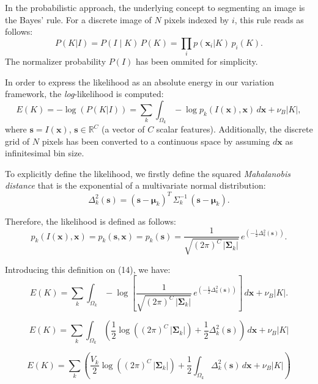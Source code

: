 In the probabilistic approach, the underlying concept to segmenting an image is the
Bayes' rule. For a discrete image of $N$ pixels indexed by $i$, this rule reads as
follows:
\begin{equation}
P(K|I)=P(I \mid K)\, P(K)=\underset{i}{\prod} p (\mathbf{x}_i | K ) \, p_i(K).
\end{equation}
The normalizer probability $P(I)$ has been ommited for simplicity.

In order to express the likelihood as an absolute energy in our variation framework,
the \textit{log}-likelihood is computed:
\begin{equation}
E(K)= -\log( P(K|I) ) = \sum\limits_k \int_{\Omega_k} -\log p_k(I(\mathbf{x}),\mathbf{x}) \,d\mathbf{x}+\nu_B \left|K\right|,
\end{equation}
where $\mathbf{s} = I(\mathbf{x})$, $\mathbf{s} \in \mathbb{R}^C$ (a vector of $C$ scalar features).
Additionally, the discrete grid of $N$ pixels has been converted to a continuous space by assuming
$d\mathbf{x}$ as infinitesimal bin size.

To explicitly define the likelihood, we firstly define the squared \textit{Mahalanobis distance} that
is the exponential of a multivariate normal distribution:
\begin{equation}
\Delta^2_k (\mathbf{s}) = (\mathbf{s} - \boldsymbol{\mu}_k)^T \, \Sigma^{-1}_k \, (\mathbf{s} - \boldsymbol{\mu}_k).
\end{equation}

Therefore, the likelihood is defined as follows:
\begin{equation}
p_k(I(\mathbf{x}),\mathbf{x}) = p_k(\mathbf{s},\mathbf{x})= p_k(\mathbf{s}) = \frac{1}{ \sqrt{(2\pi)^{C}\,\left|\boldsymbol{\Sigma}_{k}\right|}}\,{e^{\left(-\frac{1}{2}  \Delta^2_k (\mathbf{s}) \right)}}.
\end{equation}

Introducing this definition on (14), we have:
\begin{equation}
E(K)= \sum\limits_k \int_{\Omega_k} -\log{\left[ \frac{1}{ \sqrt{(2\pi)^{C}\,\left|\boldsymbol{\Sigma}_{k}\right|}}\,e^{\left(-\frac{1}{2}  \Delta^2_k (\mathbf{s}) \right)} \right] } \,d\mathbf{x}+\nu_B \left|K\right|.
\end{equation}

\begin{equation}
E(K) = \sum\limits_k \int_{\Omega_k} \left( \frac{1}{2} \log{ \left( (2\pi)^{C}\,\left|\boldsymbol{\Sigma}_{k}\right| \right)} + \frac{1}{2}  \Delta^2_k (\mathbf{s}) \right) \,d\mathbf{x}+\nu_B \left|K\right|
\end{equation}

\begin{equation}
E(K) = \sum\limits_k \left( \frac{ V_k }{2} \log{ \left( (2\pi)^{C}\,\left|\boldsymbol{\Sigma}_{k}\right| \right)}+ \frac{1}{2} \int_{\Omega_k} \Delta^2_k (\mathbf{s}) \,d\mathbf{x}+\nu_B \left|K\right| \right)
\end{equation}